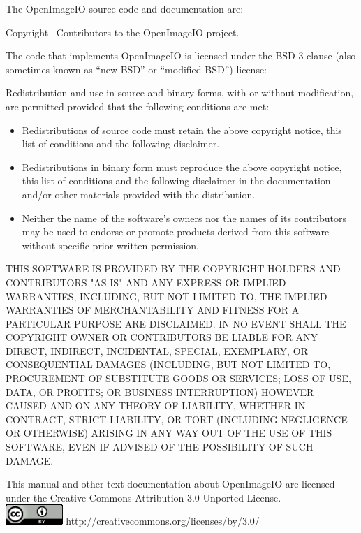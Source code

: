 \newpage
\label{speccopyr}

\vspace*{0.2in}

\noindent The OpenImageIO source code and
documentation are:

\vspace*{0.2in}

\noindent Copyright \textcopyright\ Contributors to the OpenImageIO project.

\vspace{0.5in}

The code that implements OpenImageIO is licensed under
the BSD 3-clause (also sometimes known as ``new BSD'' or
``modified BSD'') license:

\vspace{0.25in}

Redistribution and use in source and binary forms, with or without
modification, are permitted provided that the following conditions are
met:

\begin{itemize}
\item Redistributions of source code must retain the above copyright
  notice, this list of conditions and the following disclaimer.
\item Redistributions in binary form must reproduce the above copyright
  notice, this list of conditions and the following disclaimer in the
  documentation and/or other materials provided with the distribution.
\item Neither the name of the software's owners nor the names of its
  contributors may be used to endorse or promote products derived from
  this software without specific prior written permission.
\end{itemize}

THIS SOFTWARE IS PROVIDED BY THE COPYRIGHT HOLDERS AND CONTRIBUTORS
"AS IS" AND ANY EXPRESS OR IMPLIED WARRANTIES, INCLUDING, BUT NOT
LIMITED TO, THE IMPLIED WARRANTIES OF MERCHANTABILITY AND FITNESS FOR
A PARTICULAR PURPOSE ARE DISCLAIMED. IN NO EVENT SHALL THE COPYRIGHT
OWNER OR CONTRIBUTORS BE LIABLE FOR ANY DIRECT, INDIRECT, INCIDENTAL,
SPECIAL, EXEMPLARY, OR CONSEQUENTIAL DAMAGES (INCLUDING, BUT NOT
LIMITED TO, PROCUREMENT OF SUBSTITUTE GOODS OR SERVICES; LOSS OF USE,
DATA, OR PROFITS; OR BUSINESS INTERRUPTION) HOWEVER CAUSED AND ON ANY
THEORY OF LIABILITY, WHETHER IN CONTRACT, STRICT LIABILITY, OR TORT
(INCLUDING NEGLIGENCE OR OTHERWISE) ARISING IN ANY WAY OUT OF THE USE
OF THIS SOFTWARE, EVEN IF ADVISED OF THE POSSIBILITY OF SUCH DAMAGE.


\vspace{0.5in}

This manual and other text documentation about OpenImageIO
are licensed under the Creative Commons Attribution 3.0
Unported License. \\

\smallskip
\spc \includegraphics[width=0.85in]{figures/CC-30BY.png} 
\spc http://creativecommons.org/licenses/by/3.0/
 \bigskip 

